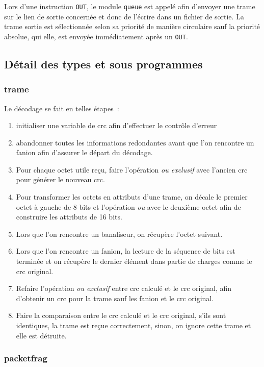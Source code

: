 \documentclass[a4paper,11pt]{article}
\begin{document}
Lors d'une instruction \texttt{OUT}, le module \texttt{queue} est appelé afin d'envoyer une trame sur le lien de sortie concernée et donc de l'écrire dans un fichier de sortie. La trame sortie est sélectionnée selon sa priorité de manière circulaire sauf la priorité absolue, qui elle, est envoyée immédiatement après un \texttt{OUT}.

\subsection{Détail des types et sous programmes}

\subsubsection{trame}
Le décodage se fait en telles étapes :
\begin{enumerate}
 \item initialiser une variable de crc afin d'effectuer le contrôle d'erreur
 \item abandonner toutes les informations redondantes avant que l'on rencontre un fanion afin d'assurer le départ du décodage.
 \item Pour chaque octet utile reçu, faire l'opération \textit{ou exclusif} avec l'ancien crc pour générer le nouveau crc.
 \item Pour transformer les octets en attributs d'une trame, on décale le premier octet à gauche de 8 bits et l'opération \textit{ou} avec le deuxième octet afin de construire les attributs de 16 bits.
 \item Lors que l'on rencontre un banaliseur, on récupère l'octet suivant.
 \item Lors que l'on rencontre un fanion, la lecture de la séquence de bits est terminée et on récupère le dernier élément dans partie de charges comme le crc original.
 \item Refaire l'opération \textit{ou exclusif} entre crc calculé et le crc original, afin d'obtenir un crc pour la trame sauf les fanion et le crc original.
 \item Faire la comparaison entre le crc calculé et le crc original, s'ils sont identiques, la trame est reçue correctement, sinon, on ignore cette trame et elle est détruite.
\end{enumerate}
\subsubsection{packetfrag}
\end{document}
